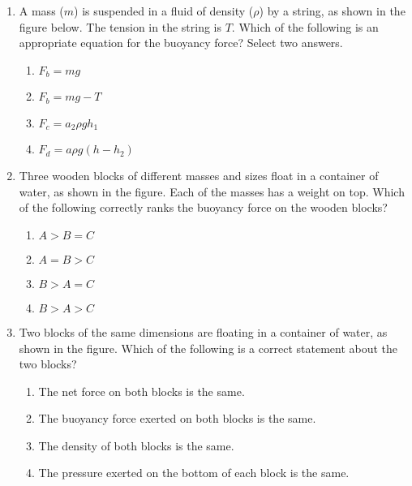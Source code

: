 \documentclass{../../oss-apphys}
\begin{document}
\begin{multicols}{2}
\begin{enumerate}[leftmargin=18pt,start=3]
  \item A mass ($m$) is suspended in a fluid of density ($\rho$) by a string,
    as shown in the figure below. The tension in the string is $T$. Which of
    the following is an appropriate equation for the buoyancy force? Select
    two answers.
    \begin{center}
      \vspace{-.15in}
    \end{center}
    \begin{enumerate}[noitemsep,topsep=0pt,leftmargin=18pt,label=(\Alph*)]
    \item $F_b=mg$
    \item $F_b=mg-T$
    \item $F_c=a_2 \rho gh_1$
    \item $F_d=a\rho g(h-h_2)$
    \end{enumerate}
    
  \item Three wooden blocks of different masses and sizes float in a container
    of water, as shown in the figure. Each of the masses has a weight on top.
    Which of the following correctly ranks the buoyancy force on the wooden
    blocks?
    \begin{center}
      \vspace{-.15in}
    \end{center}
    \begin{enumerate}[noitemsep,topsep=0pt,leftmargin=18pt,label=(\Alph*)]
    \item $A > B = C$
    \item $A = B > C$
    \item $B > A = C$
    \item $B > A > C$
    \end{enumerate}
    
  \item Two blocks of the same dimensions are floating in a container of water,
    as shown in the figure. Which of the following is a correct statement about
    the two blocks?
    \begin{center}
      \vspace{-.15in}
    \end{center}
    \begin{enumerate}[noitemsep,topsep=0pt,leftmargin=18pt,label=(\Alph*)]
    \item The net force on both blocks is the same.
    \item The buoyancy force exerted on both blocks is the same.
    \item The density of both blocks is the same.
    \item The pressure exerted on the bottom of each block is the same.
    \end{enumerate}


\end{enumerate}
\end{multicols}
\end{document}
